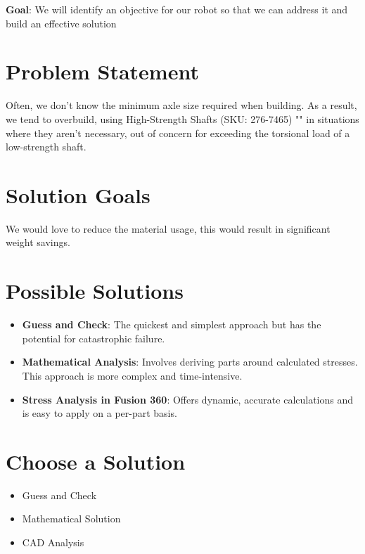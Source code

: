 \textbf{Goal}: We will identify an objective for our robot so that we can address it and build an effective solution
\section*{Problem Statement}
Often, we don't know the minimum axle size required when building. As a result, we tend to overbuild, using High-Strength Shafts (SKU: 276-7465) "\cite{vexRobotics}" in situations where they aren't necessary, out of concern for exceeding the torsional load of a low-strength shaft.
\section*{Solution Goals}
We would love to reduce the material usage, this would result in significant weight savings.
\section*{Possible Solutions}
\begin{itemize}
	\item \textbf{Guess and Check}: The quickest and simplest approach but has the potential for catastrophic failure.
	\item \textbf{Mathematical Analysis}: Involves deriving parts around calculated stresses. This approach is more complex and time-intensive.
	\item \textbf{Stress Analysis in Fusion 360}: Offers dynamic, accurate calculations and is easy to apply on a per-part basis.
\end{itemize}
\section*{Choose a Solution}
\begin{itemize}
	\item Guess and Check
	\item Mathematical Solution
	\item CAD Analysis
\end{itemize}

